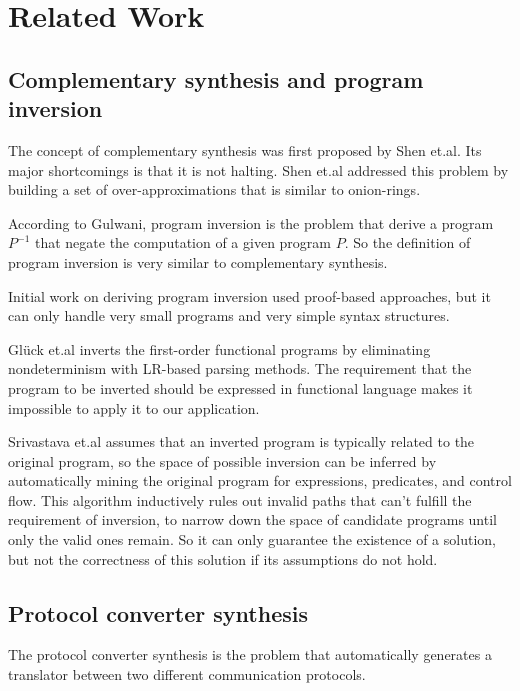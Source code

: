 \documentclass{sig-alternate}
\begin{document}

\section{Related Work}\label{sec_relwork}
\subsection{Complementary synthesis and program inversion}
The concept of complementary synthesis was first proposed by Shen et.al\cite{ShengYuShen:iccad09,ShengYuShen:tcad}.
Its major shortcomings is that it is not halting.
Shen et.al\cite{ShengYuShen:fmcad10} addressed this problem by building a set of over-approximations that is similar to onion-rings.

According to Gulwani\cite{dim_syn},
program inversion is the problem that derive a program $P^{-1}$
that negate the computation of a given program $P$.
So the definition of program inversion is very similar to complementary synthesis.

Initial work on deriving program inversion used proof-based approaches\cite{prog_inv},
but it can only handle very small programs and very simple syntax structures.

Gl\"{u}ck et.al \cite{mtd_autoProginv} inverts the first-order functional programs
by eliminating nondeterminism with LR-based parsing methods.
The requirement that the program to be inverted should be expressed in functional language makes it impossible to apply it to our application.

Srivastava et.al \cite{prog_inv_rev} assumes that an inverted program is typically related to the original program,
so the space of possible inversion can be inferred by automatically
mining the original program for expressions, predicates, and control flow.
This algorithm inductively rules out invalid paths that can't fulfill the requirement of inversion,
to narrow down the space of candidate programs until only the valid ones remain.
So it can only guarantee the existence of a solution,
but not the correctness of this solution if its assumptions do not hold.


\subsection{Protocol converter synthesis}
The protocol converter synthesis is the problem that automatically generates a translator between two different communication protocols.
\end{document}
